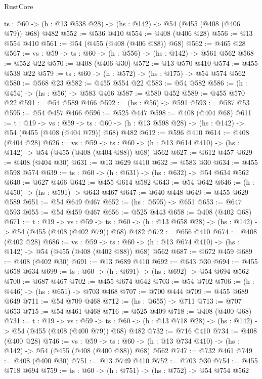 \begin{lexlean}{RustCore}
\begin{coremodule}
  {ts : @60} -> (h : @13 @538 @28) -> (hs : @142) -> @54 (@455 (@408 (@406 @79)) @68) @482
@552 := @536 @410
@554 := @408 (@406 @28)
@556 := @13 @554 @410
@561 := @54 (@455 (@408 (@406 @88)) @68)
@562 := @465 @28
@567 := {vs : @59} -> {ts : @60} -> (h : @556) -> (hs : @142) -> @561 @562
@568 := @552 @22
@570 := @408 (@406 @30)
@572 := @13 @570 @410
@574 := @455 @538 @22
@579 := {ts : @60} -> (h : @572) -> (hs : @175) -> @54 @574 @562
@580 := @568 @23
@582 := @455 @554 @22
@583 := @54 @582
@586 := (h : @454) -> (hs : @56) -> @583 @466
@587 := @580 @452
@589 := @455 @570 @22
@591 := @54 @589 @466
@592 := (hs : @56) -> @591
@593 := @587 @53
@595 := @54 @457 @466
@596 := @525 @447
@598 := @408 (@404 @68)
@611 := {t : @19} ->
  {vs : @59} ->
  {ts : @60} -> (h : @13 @598 @28) -> (hs : @142) -> @54 (@455 (@408 (@404 @79)) @68) @482
@612 := @596 @410
@614 := @408 (@404 @28)
@626 := {vs : @59} ->
  {ts : @60} -> (h : @13 @614 @410) -> (hs : @142) -> @54 (@455 (@408 (@404 @88)) @68) @562
@627 := @612 @457
@629 := @408 (@404 @30)
@631 := @13 @629 @410
@632 := @583 @30
@634 := @455 @598 @574
@639 := {ts : @60} -> (h : @631) -> (hs : @632) -> @54 @634 @562
@640 := @627 @466
@642 := @455 @614 @582
@643 := @54 @642
@646 := (h : @450) -> (hs : @591) -> @643 @467
@647 := @640 @448
@649 := @455 @629 @589
@651 := @54 @649 @467
@652 := (hs : @595) -> @651
@653 := @647 @593
@655 := @54 @459 @467
@656 := @525 @443
@658 := @408 (@402 @68)
@671 := {t : @19} ->
  {vs : @59} ->
  {ts : @60} -> (h : @13 @658 @28) -> (hs : @142) -> @54 (@455 (@408 (@402 @79)) @68) @482
@672 := @656 @410
@674 := @408 (@402 @28)
@686 := {vs : @59} ->
  {ts : @60} -> (h : @13 @674 @410) -> (hs : @142) -> @54 (@455 (@408 (@402 @88)) @68) @562
@687 := @672 @459
@689 := @408 (@402 @30)
@691 := @13 @689 @410
@692 := @643 @30
@694 := @455 @658 @634
@699 := {ts : @60} -> (h : @691) -> (hs : @692) -> @54 @694 @562
@700 := @687 @467
@702 := @455 @674 @642
@703 := @54 @702
@706 := (h : @446) -> (hs : @651) -> @703 @468
@707 := @700 @444
@709 := @455 @689 @649
@711 := @54 @709 @468
@712 := (hs : @655) -> @711
@713 := @707 @653
@715 := @54 @461 @468
@716 := @525 @409
@718 := @408 (@400 @68)
@731 := {t : @19} ->
  {vs : @59} ->
  {ts : @60} -> (h : @13 @718 @28) -> (hs : @142) -> @54 (@455 (@408 (@400 @79)) @68) @482
@732 := @716 @410
@734 := @408 (@400 @28)
@746 := {vs : @59} ->
  {ts : @60} -> (h : @13 @734 @410) -> (hs : @142) -> @54 (@455 (@408 (@400 @88)) @68) @562
@747 := @732 @461
@749 := @408 (@400 @30)
@751 := @13 @749 @410
@752 := @703 @30
@754 := @455 @718 @694
@759 := {ts : @60} -> (h : @751) -> (hs : @752) -> @54 @754 @562

\end{coremodule}
\end{lexlean}
